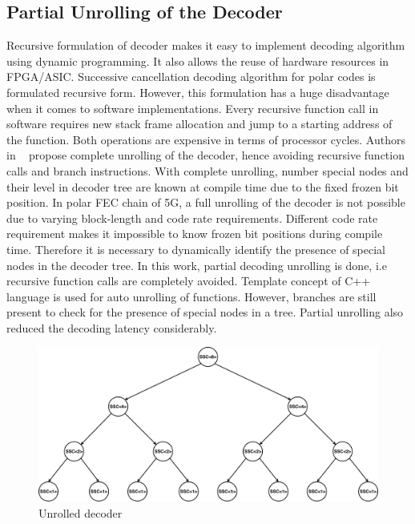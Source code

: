 \subsection{Partial Unrolling of the Decoder}
Recursive formulation of decoder makes it easy to implement decoding algorithm using dynamic programming. It also allows the reuse of hardware resources in FPGA/ASIC. Successive cancellation decoding algorithm for polar codes is formulated recursive form. However, this formulation has a huge disadvantage when it comes to software implementations. Every recursive function call in software requires new stack frame allocation and jump to a starting address of the function. Both operations are expensive in terms of processor cycles. Authors in ~\cite{fastPolarDecodersAlgoImpl} propose complete unrolling of the decoder, hence avoiding recursive function calls and branch instructions. With complete unrolling, number special nodes and their level in decoder tree are known at compile time due to the fixed frozen bit position. In polar FEC chain of 5G, a full unrolling of the decoder is not possible due to varying block-length and code rate requirements. Different code rate requirement makes it impossible to know frozen bit positions during compile time. Therefore it is necessary to dynamically identify the presence of special nodes in the decoder tree. In this work, partial decoding unrolling is done, i.e recursive function calls are completely avoided. Template concept of C++ language is used for auto unrolling of functions. However, branches are still present to check for the presence of special nodes in a tree. Partial unrolling also reduced the decoding latency considerably.

\begin{figure}[]
	\centering
	\includegraphics[width=1\textwidth]{./figures/unrolledDecoder.pdf}
	\caption{Unrolled decoder}
	\label{fig:unrolledDecoder}
\end{figure}

